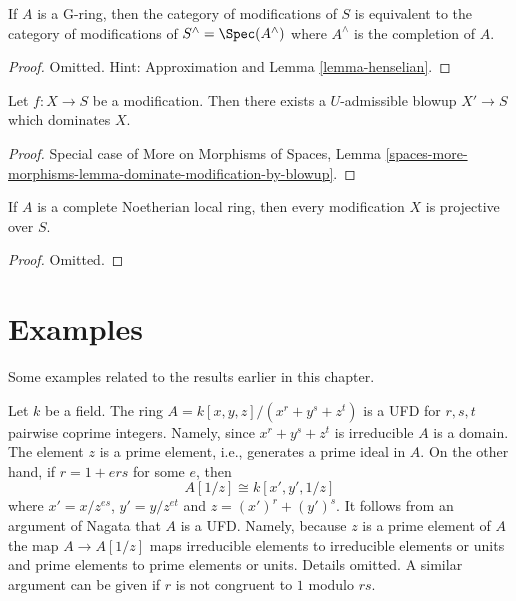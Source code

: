 \begin{lemma}
\label{lemma-G-ring}
If $A$ is a G-ring, then the category of modifications of $S$ is equivalent
to the category of modifications of $S^\wedge = \Spec(A^\wedge)$ where
$A^\wedge$ is the completion of $A$.
\end{lemma}

\begin{proof}
Omitted. Hint: Approximation and Lemma \ref{lemma-henselian}.
\end{proof}

\begin{lemma}
\label{lemma-dominate-by-admissible-blowup}
Let $f : X \to S$ be a modification. Then there exists a $U$-admissible
blowup $X' \to S$ which dominates $X$.
\end{lemma}

\begin{proof}
Special case of More on Morphisms of Spaces,
Lemma \ref{spaces-more-morphisms-lemma-dominate-modification-by-blowup}.
\end{proof}

\begin{lemma}
\label{lemma-projective-over-complete}
If $A$ is a complete Noetherian local ring, then every modification
$X$ is projective over $S$.
\end{lemma}

\begin{proof}
Omitted.
\end{proof}






\section{Examples}
\label{section-examples}

\noindent
Some examples related to the results earlier in this chapter.

\begin{example}
\label{example-factorial}
\begin{reference}
\cite[4(c)]{Samuel-UFD}
\end{reference}
Let $k$ be a field. The ring $A = k[x, y, z]/(x^r + y^s + z^t)$
is a UFD for $r, s, t$ pairwise coprime integers. Namely, since
$x^r + y^s + z^t$ is irreducible $A$ is a domain. The element $z$
is a prime element, i.e., generates a prime ideal in $A$.
On the other hand, if $r = 1 + ers$ for some $e$, then
$$
A[1/z] \cong k[x', y', 1/z]
$$
where $x' = x/z^{es}$, $y' = y/z^{et}$ and $z = (x')^r + (y')^s$.
It follows from an argument of Nagata that $A$ is a UFD. Namely,
because $z$ is a prime element of $A$ the map $A \to A[1/z]$ maps
irreducible elements to irreducible elements or units and prime elements
to prime elements or units. Details omitted.
A similar argument can be given if $r$ is not congruent to $1$
modulo $rs$.
\end{example}

